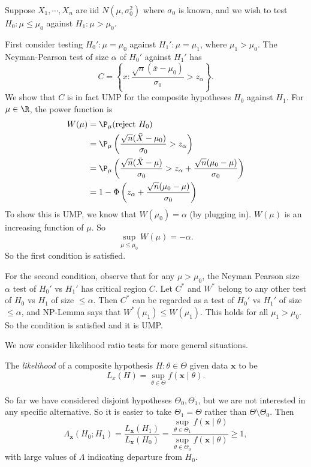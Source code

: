 \documentclass[a4paper]{article}
\begin{document}
\begin{eg}
  Suppose $X_1, \cdots, X_n$ are iid $N(\mu, \sigma_0^2)$ where $\sigma_0$ is known, and we wish to test $H_0: \mu\leq \mu_0$ against $H_1: \mu > \mu_0$.

  First consider testing $H_0': \mu = \mu_0$ against $H_1': \mu = \mu_1$, where $\mu_1 > \mu_0$. The Neyman-Pearson test of size $\alpha$ of $H_0'$ against $H_1'$ has
  \[
    C = \left\{x: \frac{\sqrt{n}(\bar x - \mu_0)}{\sigma_0} > z_\alpha\right\}.
  \]
  We show that $C$ is in fact UMP for the composite hypotheses $H_0$ against $H_1$. For $\mu\in \R$, the power function is
  \begin{align*}
    W(\mu) &= \P_\mu(\text{reject } H_0)\\
    &= \P_\mu\left(\frac{\sqrt{n}(\bar X - \mu_0)}{\sigma_0} > z_\alpha\right)\\
    &= \P_\mu\left(\frac{\sqrt{n}(\bar X - \mu)}{\sigma_0} > z_\alpha + \frac{\sqrt{n}(\mu_0 - \mu)}{\sigma_0}\right)\\
    &= 1 - \Phi\left(z_\alpha + \frac{\sqrt{n}(\mu_0 - \mu)}{\sigma_0}\right)
  \end{align*}
  To show this is UMP, we know that $W(\mu_0) = \alpha$ (by plugging in). $W(\mu)$ is an increasing function of $\mu$. So
  \[
    \sup_{ \mu \leq \mu_0} W(\mu) =- \alpha.
  \]
  So the first condition is satisfied.

  For the second condition, observe that for any $\mu > \mu_0$, the Neyman Pearson size $\alpha$ test of $H_0'$ vs $H_1'$ has critical region $C$. Let $C^*$ and $W^*$ belong to any other test of $H_0$ vs $H_1$ of size $\leq \alpha$. Then $C^*$ can be regarded as a test of $H_0'$ vs $H_1'$ of size $\leq \alpha$, and NP-Lemma says that $W^*(\mu_1) \leq W(\mu_1)$. This holds for all $\mu_1 > \mu_0$. So the condition is satisfied and it is UMP.
\end{eg}
We now consider likelihood ratio tests for more general situations.
\begin{defi}
  The \emph{likelihood} of a composite hypothesis $H:\theta\in \Theta$ given data $\mathbf{x}$ to be
  \[
    L_x(H) = \sup_{\theta\in \Theta}f(\mathbf{x}\mid \theta).
  \]
\end{defi}
So far we have considered disjoint hypotheses $\Theta_0, \Theta_1$, but we are not interested in any specific alternative. So it is easier to take $\Theta_1 = \Theta$ rather than $\Theta \setminus\Theta_0$. Then
\[
  \Lambda_\mathbf{x} (H_0; H_1) = \frac{L_\mathbf{x}(H_1)}{L_\mathbf{x}(H_0)}=\frac{\sup_{\theta\in \Theta_1}f(\mathbf{x}\mid \theta)}{\sup_{\theta\in \Theta_0}f(\mathbf{x}\mid \theta)} \geq 1,
\]
with large values of $\Lambda$ indicating departure from $H_0$.
\end{document}
